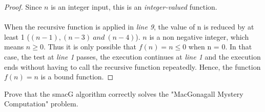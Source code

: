 \documentclass[12pt]{article}
\newenvironment{problem}[2][Problem]{\begin{trivlist}
\item[\hskip \labelsep {\bfseries #1}\hskip \labelsep {\bfseries #2.}]}{\end{trivlist}}
\begin{document}
\begin{proof}
    Since $n$ is an integer input, this is an \textit{integer-valued} function.\\ \\ When the 
    recursive function is applied in \textit{line 9}, the value of n is reduced by at least 1 
    ($(n-1), (n-3) \ and \ (n-4)$). \newline \newline $n$ is a non negative integer, which means 
    $n \geq 0$. Thus it is only possible that $ f(n) = n \leq 0$ when n = 0. In that case, the test 
    at \textit{line 1} passes, the execution continues at \textit{line 1} and the execution ends 
    without having to call the recursive function repeatedly. \newline \newline Hence, the function 
    $f(n) = n$ is a bound function. 
\end{proof}


\begin{problem}{2}
    Prove that the smacG algorithm correctly solves the "MacGonagall Mystery Computation" problem.
\end{problem}
\end{document}

